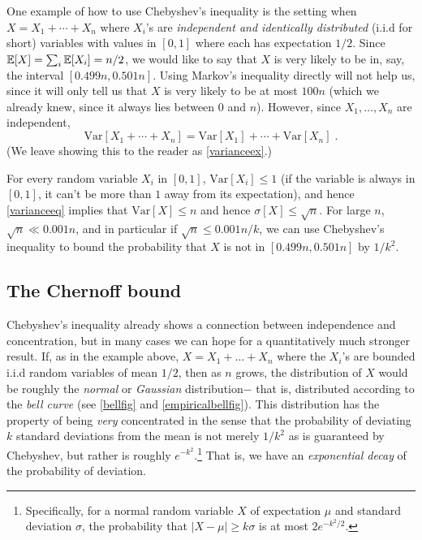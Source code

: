 One example of how to use Chebyshev's inequality is the setting when
\(X = X_1 + \cdots + X_n\) where \(X_i\)'s are \emph{independent and
identically distributed} (i.i.d for short) variables with values in
\([0,1]\) where each has expectation \(1/2\). Since
\(\operatorname*{\mathbb E}[X] = \sum_i \operatorname*{\mathbb E}[X_i] = n/2\), we would like to say that \(X\) is
very likely to be in, say, the interval \([0.499n,0.501n]\). Using
Markov's inequality directly will not help us, since it will only tell
us that \(X\) is very likely to be at most \(100n\) (which we already
knew, since it always lies between \(0\) and \(n\)). However, since
\(X_1,\ldots,X_n\) are independent, \[
\mathrm{Var}[X_1+\cdots +X_n] = \mathrm{Var}[X_1]+\cdots + \mathrm{Var}[X_n]  \label{varianceeq}\;.
\] (We leave showing this to the reader as \cref{varianceex}.)

For every random variable \(X_i\) in \([0,1]\),
\(\mathrm{Var}[X_i] \leq 1\) (if the variable is always in \([0,1]\), it
can't be more than \(1\) away from its expectation), and hence
\eqref{varianceeq} implies that \(\mathrm{Var}[X]\leq n\) and hence
\(\sigma[X] \leq \sqrt{n}\). For large \(n\), \(\sqrt{n} \ll 0.001n\),
and in particular if \(\sqrt{n} \leq 0.001n/k\), we can use Chebyshev's
inequality to bound the probability that \(X\) is not in
\([0.499n,0.501n]\) by \(1/k^2\).

\subsection{The Chernoff bound}\label{The-Chernoff-bound}

Chebyshev's inequality already shows a connection between independence
and concentration, but in many cases we can hope for a quantitatively
much stronger result. If, as in the example above, \(X= X_1+\ldots+X_n\)
where the \(X_i\)'s are bounded i.i.d random variables of mean \(1/2\),
then as \(n\) grows, the distribution of \(X\) would be roughly the
\emph{normal} or \emph{Gaussian} distribution\(-\) that is, distributed
according to the \emph{bell curve} (see \cref{bellfig} and
\cref{empiricalbellfig}). This distribution has the property of being
\emph{very} concentrated in the sense that the probability of deviating
\(k\) standard deviations from the mean is not merely \(1/k^2\) as is
guaranteed by Chebyshev, but rather is roughly \(e^{-k^2}\).\footnote{Specifically,
  for a normal random variable \(X\) of expectation \(\mu\) and standard
  deviation \(\sigma\), the probability that \(|X-\mu| \geq k\sigma\) is
  at most \(2e^{-k^2/2}\).} That is, we have an \emph{exponential decay}
of the probability of deviation.


